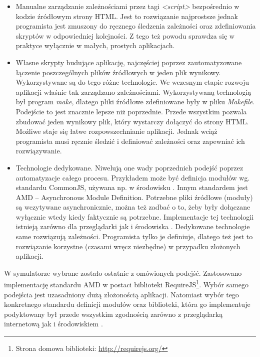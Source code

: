 \begin{itemize}

\item Manualne zarządzanie zależnościami przez tagi \emph{<script>} bezpośrednio
w kodzie źródłowym strony HTML. Jest to rozwiązanie najprostsze jednak
programista jest zmuszony do ręcznego śledzenia zależności oraz zdefiniowania
skryptów w odpowiedniej kolejności. Z tego też powodu sprawdza się w praktyce
wyłącznie w małych, prostych aplikacjach.

\item Własne skrypty budujące aplikację, najczęściej poprzez zautomatyzowane
łączenie poszczególnych plików źródłowych w jeden plik wynikowy. Wykorzystywane
są do tego różne technologie. We wczesnym etapie rozwoju aplikacji \en właśnie
tak zarządzano zależnościami. Wykorzystywaną technologią był program
\emph{make}, dlatego pliki źródłowe zdefiniowane były w pliku \emph{Makefile}.
Podejście to jest znacznie lepsze niż poprzednie. Przede wszystkim pozwala
zbudować jeden wynikowy plik, który wystarczy dołączyć do strony HTML. Możliwe
staje się łatwe rozpowszechnianie aplikacji. Jednak wciąż programista musi
ręcznie śledzić i definiować zależności oraz zapewniać ich rozwiązywanie.

\item Technologie dedykowane. Niwelują one wady poprzednich podejść poprzez
automatyzacje całego procesu. Przykładem może być definicja modułów wg.
standardu CommonJS, używana np. w środowisku . Innym standardem jest
AMD -- Asynchronous Module Definition. Potrzebne pliki źródłowe (moduły) są
wczytywane asynchronicznie, można też zadbać o to, żeby były dołączane wyłącznie
wtedy kiedy faktycznie są potrzebne. Implementacje tej technologii istnieją
zarówno dla przeglądarki jak i środowiska . Dedykowane technologie
same rozwiązują zależności. Programista tylko je definiuje, dlatego też jest to
rozwiązanie korzystne (czasami wręcz niezbędne) w przypadku złożonych aplikacji.

\end{itemize}

W symulatorze \en wybrane zostało ostatnie z omówionych podejść. Zastosowano
implementację standardu AMD w postaci biblioteki RequireJS\footnote {Strona
domowa biblioteki: \url{http://requirejs.org/}}. Wybór samego podejścia jest
uzasadniony dużą złożonością aplikacji. Natomiast wybór tego konkretnego
standardu definicji modułów oraz biblioteki, która go implementuje podyktowany
był przede wszystkim zgodnością zarówno z przeglądarką internetową jak i
środowiskiem .

